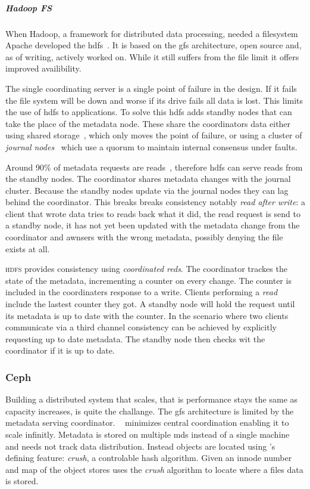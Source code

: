 \subparagraph*{Hadoop FS}
When Hadoop, a framework for distributed data processing, needed a filesystem Apache developed the \ac{hdfs}~\cite{hdfs}. It is based on the \ac{gfs} architecture, open source and, as of writing, actively worked on. While it still suffers from the file limit it offers improved availibility.

The single coordinating server is a single point of failure in the design. If it fails the file system will be down and worse if its drive fails all data is lost. This limits the use of \ac{hdfs} to applications. To solve this \ac{hdfs} adds standby nodes that can take the place of the metadata node. These share the coordinators data either using shared storage~\cite{hdfs_ha_nfs}, which only moves the point of failure, or using a cluster of \textit{journal nodes}~\cite{hdfs_ha_q} which use a quorum to maintain internal consensus under faults. 

Around 90\% of metadata requests are reads~\cite{hdfs_ha_reads}, therefore \ac{hdfs} can serve reads from the standby nodes. The coordinator shares metadata changes with the journal cluster. Because the standby nodes update via the journal nodes they can lag behind the coordinator. This breaks breaks consistency notably \textit{read after write}: a client that wrote data tries to reads back what it did, the read request is send to a standby node, it has not yet been updated with the metadata change from the coordinator and awnsers with the wrong metadata, possibly denying the file exists at all. 

\textsc{hdfs} provides consistency using \textit{coordinated reds}. The coordinator trackes the state of the metadata, incrementing a counter on every change. The counter is included in the coordinaters response to a write. Clients performing a \textit{read} include the lastest counter they got. A standby node will hold the request until its metadata is up to date with the counter. In the scenario where two clients communicate via a third channel consistency can be achieved by explicitly requesting up to date metadata. The standby node then checks wit the coordinator if it is up to date.

\subsubsection*{Ceph}
Building a distributed system that scales, that is performance stays the same as capacity increases, is quite the challange. The \ac{gfs} architecture is limited by the metadata serving coordinator. ~\cite{ceph} minimizes central coordination enabling it to scale infinitly. Metadata is stored on multiple \ac{mds} instead of a single machine and needs not track data distribution. Instead objects are located using 's defining feature: \emph{\ac{crush}}, a controlable hash algorithm. Given an innode number and map of the object stores  uses the \emph{\ac{crush}} algorithm to locate where a files data is stored. 


